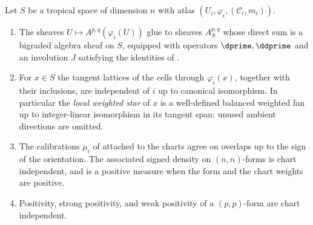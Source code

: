 \begin{theorem}
\label{thm:ch10-transition-transport}
Let $S$ be a tropical space of dimension $n$ with atlas
$(U_i,\varphi_i,(\mathscr C_i,m_i))$.
\begin{enumerate}
\item\label{itm:ch10-tr-forms} The sheaves $U\mapsto A^{p,q}(\varphi_i(U))$
      glue to sheaves $A^{p,q}_S$ whose direct sum is a bigraded algebra
      sheaf on $S$, equipped with
      operators $\dprime,\ddprime$ and an involution $J$ satisfying the
      identities of
      .
\item\label{itm:ch10-tr-lattice} For $x\in S$ the tangent lattices of the
      cells through $\varphi_i(x)$, together with their inclusions, are
      independent of $i$ up to canonical isomorphism.  In particular the
      \emph{local weighted star} of $x$ is a well-defined balanced weighted
      fan up to integer-linear isomorphism in its tangent span; unused
      ambient directions are omitted.
\item\label{itm:ch10-tr-calib} The calibrations $\mu_i$ of
       attached to the charts agree on overlaps up
      to the sign of the orientation.  The associated signed density on
      $(n,n)$-forms is chart independent, and is a positive measure when the
      form and the chart weights are positive.
\item\label{itm:ch10-tr-positivity} Positivity, strong positivity, and weak
      positivity of a $(p,p)$-form are chart independent.
\end{enumerate}
\end{theorem}


